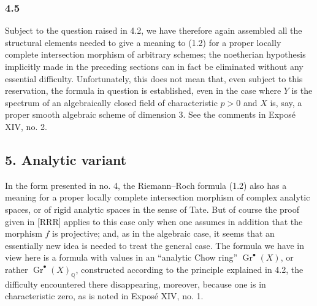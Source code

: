 \documentclass[11pt]{article}
\newcommand{\Gr}{\operatorname{Gr}}
\providecommand{\Gr}{\operatorname{Gr}}
\providecommand{\Gr}{\operatorname{G}}
\begin{document}
\subsubsection*{4.5}
Subject to the question raised in 4.2, we have therefore again assembled all the structural elements needed to give a meaning to (1.2) for a proper locally complete intersection morphism of arbitrary schemes; the noetherian hypothesis implicitly made in the preceding sections can in fact be eliminated without any essential difficulty. Unfortunately, this does not mean that, even subject to this reservation, the formula in question is established, even in the case where $Y$ is the spectrum of an algebraically closed field of characteristic $p>0$ and $X$ is, say, a proper smooth algebraic scheme of dimension $3$. See the comments in Expos\'e XIV, no. 2.

\subsection*{5. Analytic variant}
In the form presented in no. 4, the Riemann--Roch formula (1.2) also has a meaning for a proper locally complete intersection morphism of complex analytic spaces, or of rigid analytic spaces in the sense of Tate. But of course the proof given in [RRR] applies to this case only when one assumes in addition that the morphism $f$ is projective; and, as in the algebraic case, it seems that an essentially new idea is needed to treat the general case. The formula we have in view here is a formula with values in an ``analytic Chow ring'' $\Gr^\bullet(X)$, or rather $\Gr^\bullet(X)_{\mathbb Q}$, constructed according to the principle explained in 4.2, the difficulty encountered there disappearing, moreover, because one is in characteristic zero, as is noted in Expos\'e XIV, no. 1.
\end{document}
